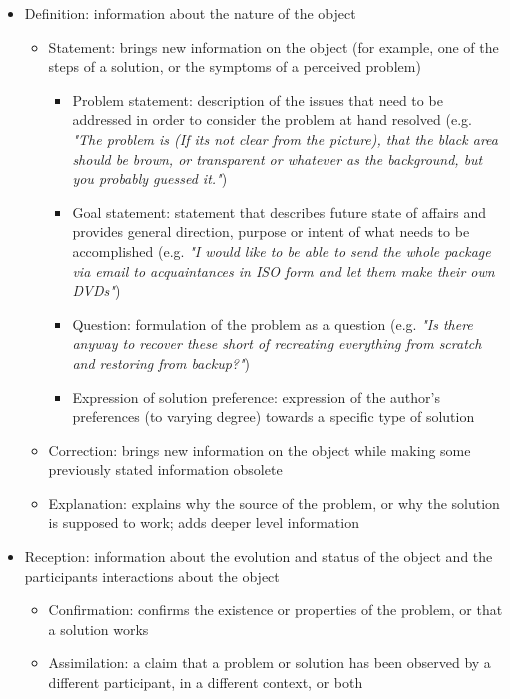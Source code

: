 \documentclass[11pt]{article}
\begin{document}
\begin{itemize}
\begin{itemize}
	\item Definition: information about the nature of the object
		\begin{itemize}
			\item Statement: brings new information on the object (for example, one of the steps of a solution, or the symptoms of a perceived problem)
					\begin{itemize}
						\item Problem statement: description of the issues that need to be addressed in order to consider the problem at hand resolved (e.g. \textit{"The problem is (If its not clear from the picture), that the black area should be brown, or transparent or whatever as the background, but you probably guessed it."})
						\item Goal statement: statement that describes future state of affairs and provides general direction, purpose or intent of what needs to be accomplished (e.g. \textit{"I would like to be able to send the whole package via email to acquaintances in ISO form and let them make their own DVDs"})
						\item Question: formulation of the problem as a question (e.g. \textit{"Is there anyway to recover these short of recreating everything from scratch and restoring from backup?"})
						\item Expression of solution preference: expression of the author's preferences (to varying degree) towards a specific type of solution
					\end{itemize}
			\item Correction: brings new information on the object while making some previously stated information obsolete
			\item Explanation: explains why the source of the problem, or why the solution is supposed to work; adds deeper level information
		\end{itemize}
	\item Reception: information about the evolution and status of the object and the participants interactions about the object
		\begin{itemize}
			\item Confirmation: confirms the existence or properties of the problem, or that a solution works
			\item Assimilation: a claim that a problem or solution has been observed by a different participant, in a different context, or both
				\begin{itemize}	

\end{itemize}
\end{itemize}
\end{itemize}
\end{itemize}
\end{document}
